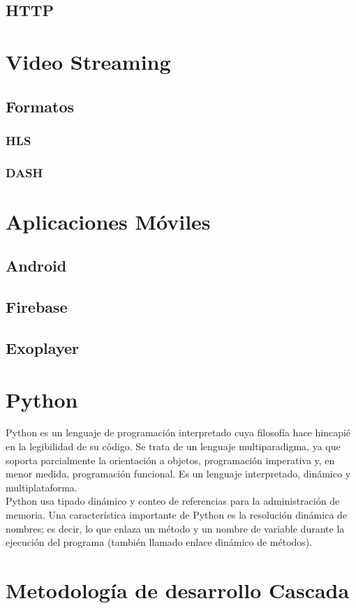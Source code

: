 \subsection{HTTP}

\section{Video Streaming}

\subsection{Formatos}

\subsubsection{HLS}

\subsubsection{DASH}

\section{Aplicaciones Móviles}

\subsection{Android}

\subsection{Firebase}

\subsection{Exoplayer}

\section{Python}
Python es un lenguaje de programación interpretado cuya filosofía hace hincapié en la legibilidad de su código. Se trata de un lenguaje multiparadigma, ya que soporta parcialmente la orientación a objetos, programación imperativa y, en menor medida, programación funcional. Es un lenguaje interpretado, dinámico y multiplataforma.\\

Python usa tipado dinámico y conteo de referencias para la administración de memoria. Una característica importante de Python es la resolución dinámica de nombres; es decir, lo que enlaza un método y un nombre de variable durante la ejecución del programa (también llamado enlace dinámico de métodos).\\

\section{Metodología de desarrollo Cascada}